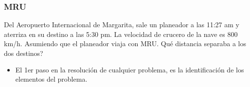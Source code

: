 \documentclass{beamer}
\begin{document}
\begin{frame}
\begin{center}
\end{center}
                                                              
                                                               
                                                               
                                                               
                                                               
\end{frame}

\begin{frame}
\frametitle{MRU}
% 
 
Del Aeropuerto Internacional de Margarita, sale un {{
planeador}} a las 11:27 am y aterriza en su destino a las
5:30 pm. La velocidad de crucero de la nave es 800 km/h.
Asumiendo que el{{ planeador}} viaja con MRU. Qu\'e
distancia separaba a los dos destinos?

 
\begin{itemize}                                                              

\item El 1er paso en la resoluci\'on de cualquier problema, es la
identificaci\'on de los elementos del problema.            
              
\end{itemize}

\end{frame}
\end{document}
